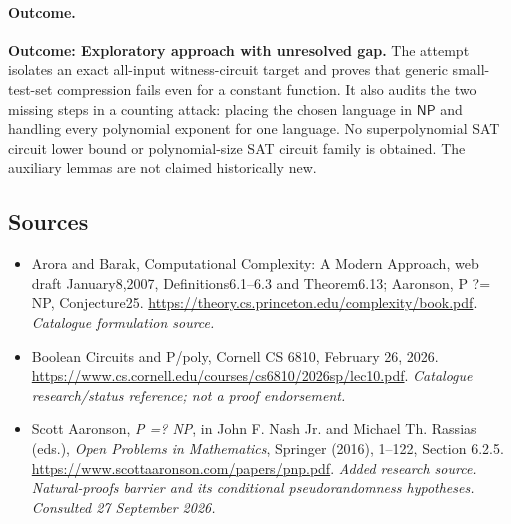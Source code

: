 \documentclass[11pt,a4paper]{article}
\begin{document}
\paragraph{Outcome.}
\textbf{Outcome: Exploratory approach with unresolved gap.}
The attempt isolates an exact all-input witness-circuit target and proves
that generic small-test-set compression fails even for a constant
function. It also audits the two missing steps in a counting attack:
placing the chosen language in $\mathsf{NP}$ and handling every polynomial
exponent for one language. No superpolynomial SAT circuit lower bound or
polynomial-size SAT circuit family is obtained. The auxiliary lemmas
are not claimed historically new.
\subsection{Sources}
\begin{itemize}\raggedright
\item[\textnormal{[S1]}]\hypertarget{source:statement:1}{} Arora and Barak, Computational Complexity: A Modern Approach, web draft January8,2007, Definitions6.1–6.3 and Theorem6.13; Aaronson, P ?= NP, Conjecture25.
\url{https://theory.cs.princeton.edu/complexity/book.pdf}.
{\small\textit{Catalogue formulation source.}}
\item[\textnormal{[S2]}]\hypertarget{source:statement:2}{} Boolean Circuits and P/poly, Cornell CS 6810, February 26, 2026.
\url{https://www.cs.cornell.edu/courses/cs6810/2026sp/lec10.pdf}.
{\small\textit{Catalogue research/status reference; not a proof endorsement.}}
\item[\textnormal{[E1]}]\hypertarget{extra:statement:1}{} Scott Aaronson, \emph{P =? NP}, in John F. Nash Jr. and Michael Th. Rassias (eds.), \emph{Open Problems in Mathematics}, Springer (2016), 1--122, Section 6.2.5.
\url{https://www.scottaaronson.com/papers/pnp.pdf}.
{\small\textit{Added research source. Natural-proofs barrier and its conditional pseudorandomness hypotheses. Consulted 27 September 2026.}}
\end{itemize}

\end{document}
